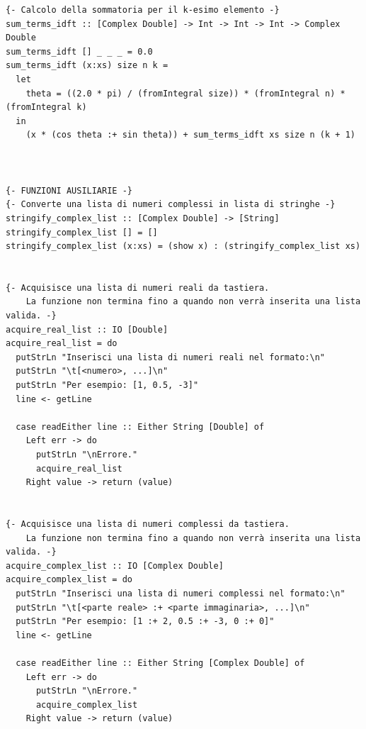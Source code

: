 \documentclass{report}
\begin{document}
{\begin{verbatim}
{- Calcolo della sommatoria per il k-esimo elemento -}
sum_terms_idft :: [Complex Double] -> Int -> Int -> Int -> Complex Double
sum_terms_idft [] _ _ _ = 0.0
sum_terms_idft (x:xs) size n k =
  let
    theta = ((2.0 * pi) / (fromIntegral size)) * (fromIntegral n) * (fromIntegral k)
  in
    (x * (cos theta :+ sin theta)) + sum_terms_idft xs size n (k + 1)



{- FUNZIONI AUSILIARIE -}
{- Converte una lista di numeri complessi in lista di stringhe -}
stringify_complex_list :: [Complex Double] -> [String]
stringify_complex_list [] = []
stringify_complex_list (x:xs) = (show x) : (stringify_complex_list xs)


{- Acquisisce una lista di numeri reali da tastiera.
    La funzione non termina fino a quando non verrà inserita una lista valida. -}
acquire_real_list :: IO [Double]
acquire_real_list = do
  putStrLn "Inserisci una lista di numeri reali nel formato:\n"
  putStrLn "\t[<numero>, ...]\n"
  putStrLn "Per esempio: [1, 0.5, -3]"
  line <- getLine
  
  case readEither line :: Either String [Double] of
    Left err -> do
      putStrLn "\nErrore."
      acquire_real_list
    Right value -> return (value)


{- Acquisisce una lista di numeri complessi da tastiera.
    La funzione non termina fino a quando non verrà inserita una lista valida. -}
acquire_complex_list :: IO [Complex Double]
acquire_complex_list = do
  putStrLn "Inserisci una lista di numeri complessi nel formato:\n"
  putStrLn "\t[<parte reale> :+ <parte immaginaria>, ...]\n"
  putStrLn "Per esempio: [1 :+ 2, 0.5 :+ -3, 0 :+ 0]"
  line <- getLine
  
  case readEither line :: Either String [Complex Double] of
    Left err -> do
      putStrLn "\nErrore."
      acquire_complex_list
    Right value -> return (value)
  \end{verbatim}
	}
	\normalsize

	
\end{document}
